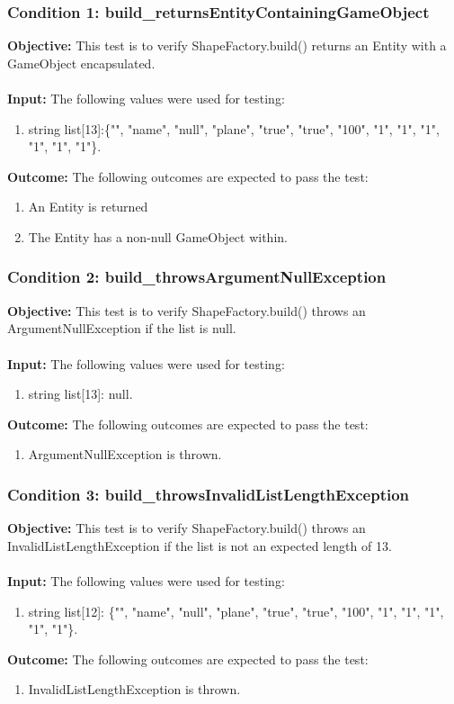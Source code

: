 \documentclass[a4paper,12pt]{article}
\begin{document}
		\subsubsection{Condition 1: build\_returnsEntityContainingGameObject}
			\textbf{Objective:} This test is to verify  ShapeFactory.build() returns an Entity with a GameObject encapsulated.\\\\
			\textbf{Input:} The following values were used for testing:
				\begin{enumerate}
					\item string list[13]:\{"", "name", "null", "plane", "true", "true", "100", "1", "1", "1", "1", "1", "1"\}.
				\end{enumerate}
			\textbf{Outcome:} The following outcomes are expected to pass the test:
				\begin{enumerate}
					\item An Entity is returned
					\item The Entity has a non-null GameObject within.
				\end{enumerate}
		\subsubsection{Condition 2: build\_throwsArgumentNullException}
			\textbf{Objective:} This test is to verify  ShapeFactory.build() throws an ArgumentNullException if the list is null.\\\\
			\textbf{Input:} The following values were used for testing:
				\begin{enumerate}
					\item string list[13]: null.
				\end{enumerate}
			\textbf{Outcome:} The following outcomes are expected to pass the test:
				\begin{enumerate}
					\item ArgumentNullException is thrown.
				\end{enumerate}
		\subsubsection{Condition 3: build\_throwsInvalidListLengthException}
			\textbf{Objective:} This test is to verify  ShapeFactory.build() throws an InvalidListLengthException if the list is not an expected length of 13.\\\\
			\textbf{Input:} The following values were used for testing:
				\begin{enumerate}
					\item string list[12]: \{"", "name", "null", "plane", "true", "true", "100", "1", "1", "1", "1", "1"\}.
				\end{enumerate}
			\textbf{Outcome:} The following outcomes are expected to pass the test:
				\begin{enumerate}
					\item InvalidListLengthException is thrown.
				\end{enumerate}
\end{document}
